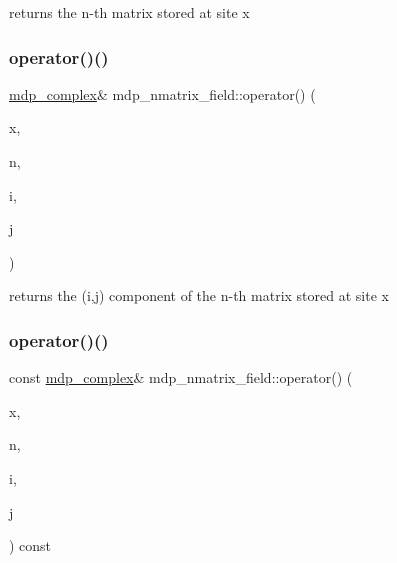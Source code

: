 returns the n-\/th matrix stored at site x 

\mbox{\label{classmdp__nmatrix__field_ab166e6abe76fcafd63dec9739da8324c}} 
\subsubsection{\texorpdfstring{operator()()}{operator()()}\hspace{0.1cm}{\footnotesize\ttfamily [2/3]}}
{\footnotesize\ttfamily \hyperlink{classmdp__complex}{mdp\+\_\+complex}\& mdp\+\_\+nmatrix\+\_\+field\+::operator() (\begin{DoxyParamCaption}\item[{\hyperlink{classmdp__site}{mdp\+\_\+site}}]{x,  }\item[{int}]{n,  }\item[{int}]{i,  }\item[{int}]{j }\end{DoxyParamCaption})\hspace{0.3cm}{\ttfamily [inline]}}



returns the (i,j) component of the n-\/th matrix stored at site x 

\mbox{\label{classmdp__nmatrix__field_a0bb8a411d6ce8499e643fd68d4f56294}} 
\subsubsection{\texorpdfstring{operator()()}{operator()()}\hspace{0.1cm}{\footnotesize\ttfamily [3/3]}}
{\footnotesize\ttfamily const \hyperlink{classmdp__complex}{mdp\+\_\+complex}\& mdp\+\_\+nmatrix\+\_\+field\+::operator() (\begin{DoxyParamCaption}\item[{\hyperlink{classmdp__site}{mdp\+\_\+site}}]{x,  }\item[{int}]{n,  }\item[{int}]{i,  }\item[{int}]{j }\end{DoxyParamCaption}) const\hspace{0.3cm}{\ttfamily [inline]}}



